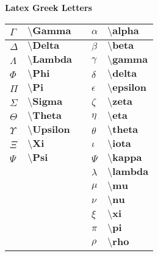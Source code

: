 \documentclass[10pt]{article}
\begin{document}
\begin{center}
\Large\textbf{Latex Greek Letters}
\end{center}

\begin{table}[h]
\centering

\begin{tabular}{|l|l|l|l|l|}
\hline
$\Gamma$   &$\textbf{\textbackslash Gamma}$   &     & $\alpha$   & $\textbf{\textbackslash alpha}$   \\ \hline
$\Delta$   &$\textbf{\textbackslash Delta}$   &     & $\beta$    & $\textbf{\textbackslash beta}$    \\ \hline
$\Lambda$  &$\textbf{\textbackslash Lambda}$  &     & $\gamma$   & $\textbf{\textbackslash gamma}$   \\ \hline
$\Phi$     &$\textbf{\textbackslash Phi}$     &    & $\delta$   & $\textbf{\textbackslash delta}$   \\ \hline
$\Pi$     &$\textbf{\textbackslash Pi}$     &    & $\epsilon$ & $\textbf{\textbackslash epsilon}$ \\ \hline
$\Sigma$   & $\textbf{\textbackslash Sigma}$   &    & $\zeta$    & $\textbf{\textbackslash zeta}$    \\ \hline
$\Theta$   & $\textbf{\textbackslash Theta}$   &    & $\eta$     & $\textbf{\textbackslash eta}$     \\ \hline
$\Upsilon$ & $\textbf{\textbackslash Upsilon}$ &     & $\theta$   & $\textbf{\textbackslash theta}$   \\ \hline
$\Xi$      & $\textbf{\textbackslash Xi}$      &    & $\iota$    & $\textbf{\textbackslash iota}$    \\ \hline
$\Psi$   & $\textbf{\textbackslash Psi}$   &    & $\Psi$   & $\textbf{\textbackslash kappa}$   \\ \hline
$\textbf{}$   & $\textbf{}$   &    & $\lambda$   & $\textbf{\textbackslash lambda}$   \\ \hline
$\textbf{}$   & $\textbf{}$   &    & $\mu$      & $\textbf{\textbackslash mu}$   \\ \hline
$\textbf{}$   & $\textbf{}$   &    & $\nu$   & $\textbf{\textbackslash nu}$   \\ \hline
$\textbf{}$   & $\textbf{}$   &    & $\xi$   & $\textbf{\textbackslash xi}$   \\ \hline
$\textbf{}$   & $\textbf{}$   &    & $\pi$   & $\textbf{\textbackslash pi}$   \\ \hline
$\textbf{}$   & $\textbf{}$   &    & $\rho$   & $\textbf{\textbackslash rho}$   \\ \hline

\end{tabular}
\end{table}
\end{document}
